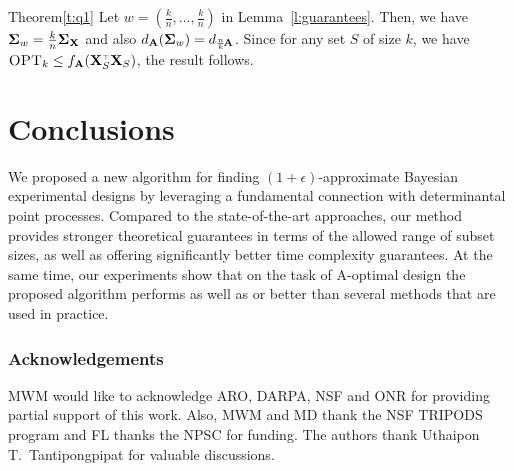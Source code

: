 \documentclass[thesis.tex]{subfiles}
\begin{document}
\begin{proofof}{Theorem}{\ref{t:q1}}
Let $w=(\frac kn,...,\frac kn)$ in Lemma~\ref{l:guarantees}. Then, we have
$\mathbf{\Sigma}_w=\frac kn\mathbf{\Sigma}_{\mathbf X}$ and also $d_{\mathbf A}(\mathbf{\Sigma}_w) =
d_{\frac nk\!\mathbf A}$. Since for any set $S$ of size $k$, we
have $\opt\leq f_{\A}(\X_S^\top\X_S)$, the result follows.
\end{proofof}



\section{Conclusions}

We proposed a new algorithm for finding
$(1+\epsilon)$-approximate Bayesian experimental designs by leveraging 
a fundamental connection with determinantal point processes. Compared
to the state-of-the-art approaches, our
method provides stronger theoretical guarantees in terms of the allowed
range of subset sizes, as well as
offering significantly better time complexity guarantees. At the same
time, our experiments show that on the task of A-optimal design the
proposed algorithm performs as well as or better than several methods that
are used in practice. 

\subsubsection*{Acknowledgements}

MWM would like to acknowledge ARO, DARPA, NSF and ONR for providing partial
  support of this work. Also, MWM and MD thank the NSF TRIPODS program
    and FL thanks the NPSC for funding.  The authors thank Uthaipon
  T.~Tantipongpipat for valuable discussions.


% 
% 


\end{document}
